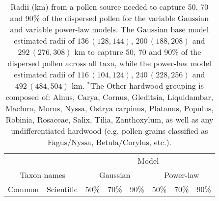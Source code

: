 \begin{landscape}
\begin{table}
\caption[]{\internallinenumbers \doublespacing Radii (km) from a pollen source needed to capture 50, 70 and
  90\% of the dispersed pollen for the variable Gaussian and variable
  power-law models. The Gaussian base model estimated radii of $136\,
  (128, 144)$, $200\, (188, 208)$ and $292\, (276, 308)$ km to capture
  50, 70 and 90\% of the dispersed pollen across all taxa, while the
  power-law model estimated radii of $116\, (104, 124)$, $240\, (228,
  256)$ and $492\, (484, 504)$ km.  $^{*}$The Other hardwood grouping
  is composed of: Alnus, Carya, Cornus, Gleditsia, Liquidambar,
  Maclura, Morus, Nyssa, Ostrya carpinus, Platanus, Populus, Robinia,
  Rosaceae, Salix, Tilia, Zanthoxylum, as well as any undifferentiated
  hardwood (e.g. pollen grains classified as Fagus/Nyssa,
  Betula/Corylus, etc.).}
\begin{center}
\begin{tabular}{ll*{6}{r@{ (}r@{, }r}}
\toprule
                             &  & \multicolumn{18}{c}{Model} \\ \cmidrule(lr){3-20}
\multicolumn{2}{c}{Taxon names} & \multicolumn{9}{c}{Gaussian} & \multicolumn{9}{c}{Power-law} \\  \cmidrule(lr){1-2}  \cmidrule(lr){3-11}  \cmidrule(lr){12-20}
Common & Scientific             & \multicolumn{3}{c}{50\%} & \multicolumn{3}{c}{70\%} & \multicolumn{3}{c}{90\%} & \multicolumn{3}{c}{50\%} & \multicolumn{3}{c}{70\%} & \multicolumn{3}{c}{90\%} \\
\cmidrule(lr){1-1} \cmidrule(lr){2-2} \cmidrule(lr){3-5} \cmidrule(lr){6-8} \cmidrule(lr){9-11} \cmidrule(lr){12-14} \cmidrule(lr){15-17} \cmidrule(lr){18-20}

\end{tabular}
\end{center}
\end{table}
\end{landscape}
